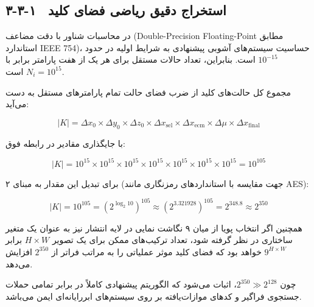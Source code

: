 \subsection{۳-۳-۱  استخراج دقیق ریاضی فضای کلید}

در محاسبات شناور با دقت مضاعف (‎Double-Precision Floating-Point‎ مطابق استاندارد ‎IEEE 754‎)، حساسیت سیستم‌های آشوبی پیشنهادی به شرایط اولیه در حدود $10^{-15}$ است. بنابراین، تعداد حالات مستقل برای هر یک از هفت پارامتر برابر با $N_i = 10^{15}$ است.

مجموع کل حالت‌های کلید از ضرب فضای حالت تمام پارامترهای مستقل به دست می‌آید:

\begin{equation}
|K| = \Delta x_0 \times \Delta y_0 \times \Delta z_0 \times \Delta x_{\mathrm{sel}} \times \Delta x_{\mathrm{ecm}} \times \Delta \mu \times \Delta x_{\mathrm{final}}
\label{eq:keyspace_prod}
\end{equation}

با جایگذاری مقادیر در رابطه فوق:

\begin{equation}
|K| = 10^{15} \times 10^{15} \times 10^{15} \times 10^{15} \times 10^{15} \times 10^{15} \times 10^{15} = 10^{105}
\label{eq:keyspace_10}
\end{equation}

برای تبدیل این مقدار به مبنای ۲ (جهت مقایسه با استانداردهای رمزنگاری مانند ‎AES‎):

\begin{equation}
|K| = 10^{105} = (2^{\log_2 10})^{105} \approx (2^{3.321928})^{105} = 2^{348.8} \approx 2^{350}
\label{eq:keyspace_2}
\end{equation}

همچنین اگر انتخاب پویا از میان ۹ نگاشت نمایی در لایه انتشار نیز به عنوان یک متغیر ساختاری در نظر گرفته شود، تعداد ترکیب‌های ممکن برای یک تصویر $H \times W$ برابر $9^{H \times W}$ خواهد بود که فضای کلید موثر عملیاتی را به مراتب فراتر از $2^{350}$ افزایش می‌دهد. 

چون $2^{350} \gg 2^{128}$، اثبات می‌شود که الگوریتم پیشنهادی کاملاً در برابر تمامی حملات جستجوی فراگیر و کدهای موازات‌یافته بر روی سیستم‌های ابررایانه‌ای ایمن می‌باشد.

